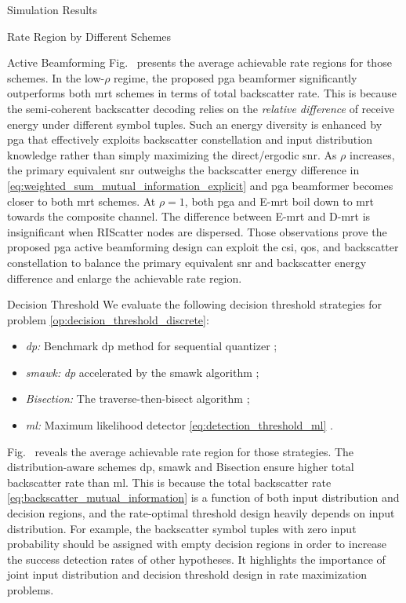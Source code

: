 \documentclass[journal]{IEEEtran}
\begin{document}
\begin{section}{Simulation Results}
\begin{subsection}{Rate Region by Different Schemes}
\begin{subsubsection}{Active Beamforming}
			Fig.~ presents the average achievable rate regions for those schemes.
			In the low-$\rho$ regime, the proposed \gls{pga} beamformer significantly outperforms both \gls{mrt} schemes in terms of total backscatter rate.
			This is because the semi-coherent backscatter decoding relies on the \emph{relative difference} of receive energy under different symbol tuples.
			Such an energy diversity is enhanced by \gls{pga} that effectively exploits backscatter constellation and input distribution knowledge rather than simply maximizing the direct/ergodic \gls{snr}.
			As $\rho$ increases, the primary equivalent \gls{snr} outweighs the backscatter energy difference in \eqref{eq:weighted_sum_mutual_information_explicit} and \gls{pga} beamformer becomes closer to both \gls{mrt} schemes.
			At $\rho=1$, both \gls{pga} and E-\gls{mrt} boil down to \gls{mrt} towards the composite channel.
			The difference between E-\gls{mrt} and D-\gls{mrt} is insignificant when RIScatter nodes are dispersed.
			Those observations prove the proposed \gls{pga} active beamforming design can exploit the \gls{csi}, \gls{qos}, and backscatter constellation to balance the primary equivalent \gls{snr} and backscatter energy difference and enlarge the achievable rate region.
		\end{subsubsection}

		\begin{subsubsection}{Decision Threshold}
			We evaluate the following decision threshold strategies for problem \eqref{op:decision_threshold_discrete}:
			\begin{itemize}
				\item \emph{\gls{dp}:} Benchmark \gls{dp} method for sequential quantizer \cite{He2021};
				\item \emph{\gls{smawk}:} \emph{\gls{dp}} accelerated by the \gls{smawk} algorithm \cite{He2021};
				\item \emph{Bisection:} The traverse-then-bisect algorithm \cite{Nguyen2020a};
				\item \emph{\gls{ml}:} Maximum likelihood detector \eqref{eq:detection_threshold_ml} \cite{Qian2019}.
			\end{itemize}

			Fig.~ reveals the average achievable rate region for those strategies.
			The distribution-aware schemes \gls{dp}, \gls{smawk} and Bisection ensure higher total backscatter rate than \gls{ml}.
			This is because the total backscatter rate \eqref{eq:backscatter_mutual_information} is a function of both input distribution and decision regions, and the rate-optimal threshold design heavily depends on input distribution.
			For example, the backscatter symbol tuples with zero input probability should be assigned with empty decision regions in order to increase the success detection rates of other hypotheses.
			It highlights the importance of joint input distribution and decision threshold design in rate maximization problems.
		\end{subsubsection}


\end{subsection}
\end{section}
\end{document}
